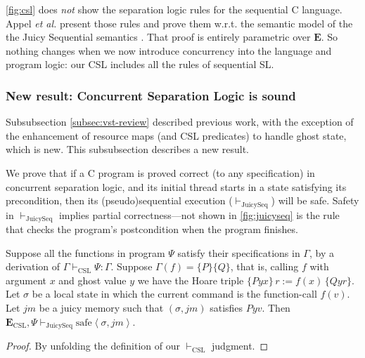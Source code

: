 \autoref{fig:csl} does \emph{not} show the separation logic rules for
the sequential C language. 
Appel \emph{et al.} present those rules \cite[Chapter 24]{appel14:plcc}
and prove them w.r.t.
the semantic model of the 
the Juicy Sequential semantics \cite[Part VI]{appel14:plcc}.
That proof is entirely parametric over $\mathbf{E}$.
So nothing changes when we now introduce
concurrency into the language and program logic:
our CSL includes all the rules of sequential SL.

\subsubsection{New result: Concurrent Separation Logic is sound}
Subsubsection \ref{subsec:vst-review} described previous work,
with the exception of the enhancement of resource maps (and CSL predicates)
to handle ghost state, which is new.  This subsubsection describes a
new result.

We prove that if a C program is proved correct (to any specification)
in concurrent separation logic, and its initial thread
starts in a state satisfying its
precondition, then its
(pseudo)sequential execution ($\vdash_\mathrm{JuicySeq}$) will be safe. 
Safety in $\vdash_\mathrm{JuicySeq}$ implies partial correctness---not shown in \autoref{fig:juicyseq} is the rule
\cite[pages 119--120]{stewart15:phd} that checks the
program's postcondition when the program finishes.

\begin{theorem}
\label{thm:seplogsound}
Suppose all the functions in program $\Psi$ satisfy their
specifications in $\Gamma$,
by a derivation of $\Gamma \vdash_\mathrm{CSL} \Psi:\Gamma$.
Suppose $\Gamma(f)=\{P\}\{Q\}$, that is,
calling $f$ with argument $x$
and ghost value $y$
we have the Hoare
triple
$\{Pyx\}\,r:=f(x)\,\{Qyr\}$.
  Let $\sigma$ be a local state in which the current command
  is the function-call $f(v)$.  Let $\mathit{jm}$ be a juicy
  memory such that $(\sigma,\mathit{jm})$ satisfies $Pyv$.
  Then
  $\mathbf{E}_\mathrm{CSL}, \Psi \vdash_\mathrm{JuicySeq}
  \mathrm{safe}\left<\sigma,\mathit{jm}\right>$.
\end{theorem}
\begin{proof}
  By unfolding the definition of our 
  $\vdash_\mathrm{CSL}$ judgment.
\end{proof}



